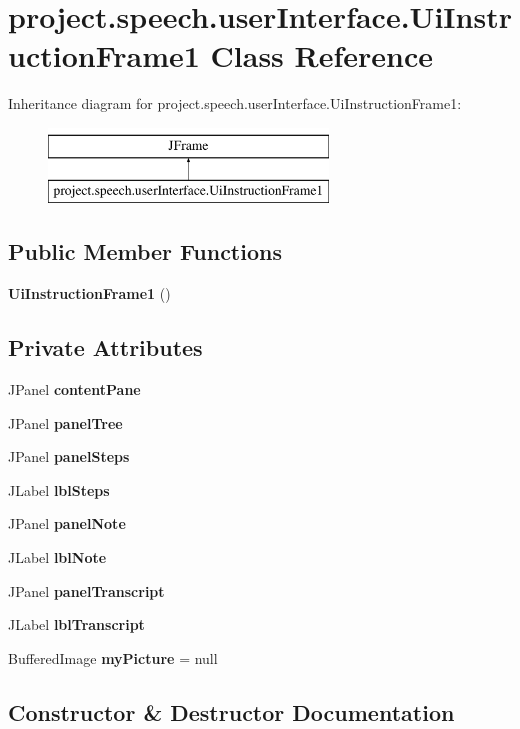 \section{project.\+speech.\+user\+Interface.\+Ui\+Instruction\+Frame1 Class Reference}
\label{classproject_1_1speech_1_1user_interface_1_1_ui_instruction_frame1}
Inheritance diagram for project.\+speech.\+user\+Interface.\+Ui\+Instruction\+Frame1\+:\begin{figure}[H]
\begin{center}
\leavevmode
\includegraphics[height=2.000000cm]{classproject_1_1speech_1_1user_interface_1_1_ui_instruction_frame1}
\end{center}
\end{figure}
\subsection*{Public Member Functions}
\begin{DoxyCompactItemize}
\item 
{\bf Ui\+Instruction\+Frame1} ()
\end{DoxyCompactItemize}
\subsection*{Private Attributes}
\begin{DoxyCompactItemize}
\item 
J\+Panel {\bf content\+Pane}
\item 
J\+Panel {\bf panel\+Tree}
\item 
J\+Panel {\bf panel\+Steps}
\item 
J\+Label {\bf lbl\+Steps}
\item 
J\+Panel {\bf panel\+Note}
\item 
J\+Label {\bf lbl\+Note}
\item 
J\+Panel {\bf panel\+Transcript}
\item 
J\+Label {\bf lbl\+Transcript}
\item 
Buffered\+Image {\bf my\+Picture} = null
\end{DoxyCompactItemize}


\subsection{Constructor \& Destructor Documentation}
